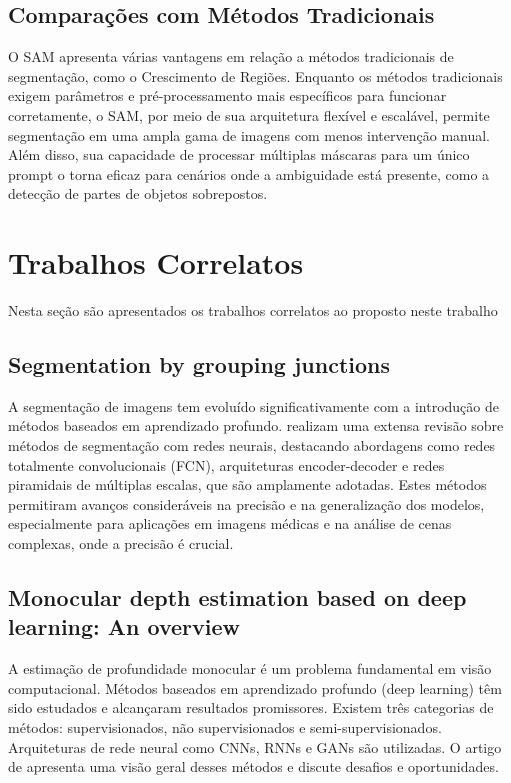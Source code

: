 \subsection{Comparações com Métodos Tradicionais}

O SAM apresenta várias vantagens em relação a métodos tradicionais de segmentação, como o Crescimento de Regiões. Enquanto os métodos tradicionais exigem parâmetros e pré-processamento mais específicos para funcionar corretamente, o SAM, por meio de sua arquitetura flexível e escalável, permite segmentação em uma ampla gama de imagens com menos intervenção manual. Além
disso, sua capacidade de processar múltiplas máscaras para um único prompt o torna eficaz para cenários onde a ambiguidade está presente, como a detecção de partes de objetos sobrepostos.

\section{Trabalhos Correlatos}

Nesta seção são apresentados os trabalhos correlatos ao proposto neste trabalho

\subsection{Segmentation by grouping junctions}

A segmentação de imagens tem evoluído significativamente com a introdução de métodos baseados em aprendizado profundo. realizam uma extensa revisão sobre métodos de segmentação com redes neurais, destacando abordagens como redes totalmente convolucionais (FCN), arquiteturas encoder-decoder e redes piramidais de múltiplas escalas, que são amplamente adotadas. Estes métodos permitiram avanços consideráveis na precisão e na generalização dos modelos, especialmente para aplicações em imagens médicas e na análise de cenas complexas, onde a precisão é crucial.

\subsection{Monocular depth estimation based on deep learning: An overview}

A estimação de profundidade monocular é um problema fundamental em visão computacional. Métodos baseados em aprendizado profundo (deep learning) têm sido estudados e alcançaram resultados promissores. Existem três categorias de métodos: supervisionados, não supervisionados e semi-supervisionados. Arquiteturas de rede neural como CNNs, RNNs e GANs são utilizadas. O artigo de \cite{zhao2020monocular} apresenta uma visão geral desses métodos e discute desafios e oportunidades.